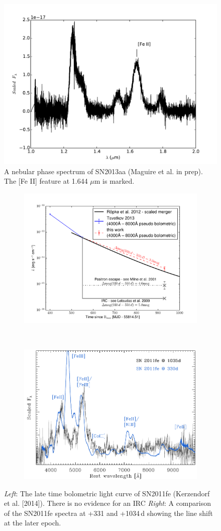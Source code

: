 \documentclass[11pt]{article}
\begin{document}
\newpage

\begin{figure}
\includegraphics[width=.7\textwidth]{../13aa.pdf}
\caption{A nebular phase spectrum of SN2013aa (Maguire et al. in prep). The [Fe II] feature at 1.644 $\mu$m is marked. }%
\label{fig:Mspec}
\end{figure}

\begin{figure}
\centering
\begin{subfigure}{\textwidth}
\includegraphics[width=.48\textwidth, trim= 0 0 35 0]{../sn11fe_bolom.pdf}
\end{subfigure}
~
\begin{subfigure}{\textwidth}
\includegraphics[width=.48\textwidth, trim= 0 0 10 0]{../11fe_II.pdf}
\label{sfig:2b}
\end{subfigure}
\caption{\emph{Left}: The late time bolometric light curve of SN2011fe (Kerzendorf et al. [2014]). There is no evidence for an IRC \emph{Right}: A comparison of the SN2011fe spectra at +331 and +1034\,d showing the line shift at the later epoch. }
\label{fig:11fe}
\end{figure}
\end{document}
